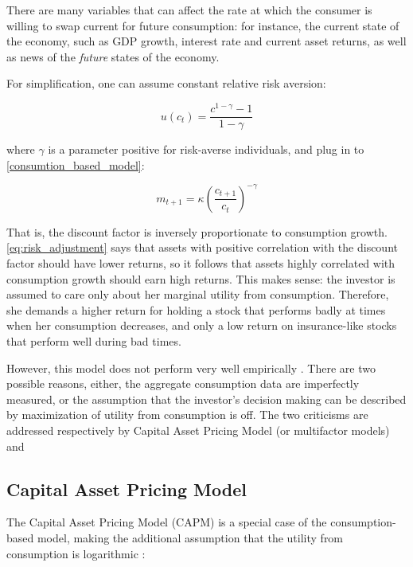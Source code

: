		 	There are many variables that can affect the rate at which the consumer is willing to swap current for future consumption: for instance, the current state of the economy, such as GDP growth, interest rate and current asset returns, as well as news of the \textit{future} states of the economy. 
		 	
		 	For simplification, one can assume constant relative risk aversion:
		 	
		 	\begin{equation}
		 		u(c_t) = \frac{c^{1-\gamma}-1}{1-\gamma}
		 	\end{equation}
		 	
		 	where $\gamma$ is a parameter positive for risk-averse individuals, and plug in to \ref{consumtion_based_model}: 
		 	
		 	\begin{equation}
		 	m_{t+1} = \kappa \left(\frac{c_{t+1}}{c_t}\right)^{-\gamma} 
		 	\end{equation}
		 	
		 	That is, the discount factor is inversely proportionate to consumption growth. \ref{eq:risk_adjustment} says that assets with positive correlation with the discount factor should have lower returns, so it follows that assets highly correlated with consumption growth should earn high returns. This makes sense: the investor is assumed to care only about her marginal utility from consumption. Therefore, she demands a higher return for holding a stock that performs badly at times when her consumption decreases, and only a low return on insurance-like stocks that perform well during bad times.
		 	 
		 	However, this model does not perform very well empirically \cite{cochrane1996cross}. There are two possible reasons, either, the aggregate consumption data are imperfectly measured, or the assumption that the investor's decision making can be described by maximization of utility from consumption is off. The two criticisms are addressed respectively by Capital Asset Pricing Model (or multifactor models) and  
	 	
	 	\subsection{Capital Asset Pricing Model}
	 	
	 		The Capital Asset Pricing Model (CAPM) is a special case of the consumption-based model, making the additional assumption that the utility from consumption is logarithmic \citep{rubinstein1976valuation}:
	 		
